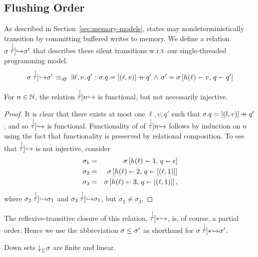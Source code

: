 \documentclass[11pt]{report}
\begin{document}
\subsection{Flushing Order} %
\label{sub:flushing}

As described in Section~\ref{sec:memory-models}, states may nondeterministically transition by committing buffered writes to memory. We define a relation $\sigma \stackrel[\tau]{}{\operatorname{\hookrightarrow}} \sigma'$ that describes these silent transitions w.r.t~our single-threaded programming model.
\begin{equation}
\begin{split}
	\label{eq:taustepat}
	\sigma \stackrel[\tau]{}{\operatorname{\hookrightarrow}} \sigma' \operatorname{\;\equiv_{\mathit{df}}\;} {} & \exists \ell, v, q' \operatorname{\,:\,} \sigma.q = \left[(\ell,v)\right]\operatorname{+\!\!\!+} q' \operatorname{\,\wedge\,} \sigma' = \sigma \left[ h(\ell) \shortleftarrow v,\,q \shortleftarrow q' \right] \\
\end{split}
\end{equation}

\begin{lemma}
	\label{lem:tau-functional}
	For $n \in \mathbb{N}$, the relation $\stackrel[\tau]{n}{\operatorname{\hookrightarrow}}$ is functional, but not necessarily injective.
\end{lemma}

\begin{proof}
	It is clear that there exists at most one $\ell,v,q'$ such that $\sigma.q = \left[(l,v)\right] \operatorname{+\!\!\!+} q'$, and so $\stackrel[\tau]{}{\operatorname{\hookrightarrow}}$ is functional. Functionality of of $\stackrel[\tau]{n}{\operatorname{\hookrightarrow}}$ follows by induction on $n$ using the fact that functionality is preserved by relational composition. To see that $\stackrel[\tau]{}{\operatorname{\hookrightarrow}}$ is not injective, consider \begin{eqnarray*}
		\sigma_1 & = & \sigma \left[ h(\ell) \shortleftarrow 1,\,q \shortleftarrow \epsilon \right] \\
		\sigma_2 & = & \sigma \left[ h(\ell) \shortleftarrow 2,\,q \shortleftarrow \left[(\ell,1)\right] \right] \\
		\sigma_3 & = & \sigma \left[ h(\ell) \shortleftarrow 3,\,q \shortleftarrow \left[(\ell,1)\right] \right],
	\end{eqnarray*} where $\sigma_2 \stackrel[\tau]{}{\operatorname{\hookrightarrow}} \sigma_1$ and $\sigma_3 \stackrel[\tau]{}{\operatorname{\hookrightarrow}} \sigma_1$, but $\sigma_2 \neq \sigma_3$. 
\end{proof}

The reflexive-transitive closure of this relation, ${\stackrel[\tau]{\ast}{\operatorname{\hookrightarrow}}}$, is, of course, a partial order. Hence we use the abbreviation $\sigma  \leq \sigma'$ as shorthand for $\sigma \stackrel[\tau]{\ast}{\operatorname{\hookrightarrow}} \sigma'$. 

\begin{lemma}
\label{lem:downset-total}
Down sets $\operatorname{\downarrow}_{\leq}\!\sigma$ are finite and linear. 	
\end{lemma}
\end{document}
